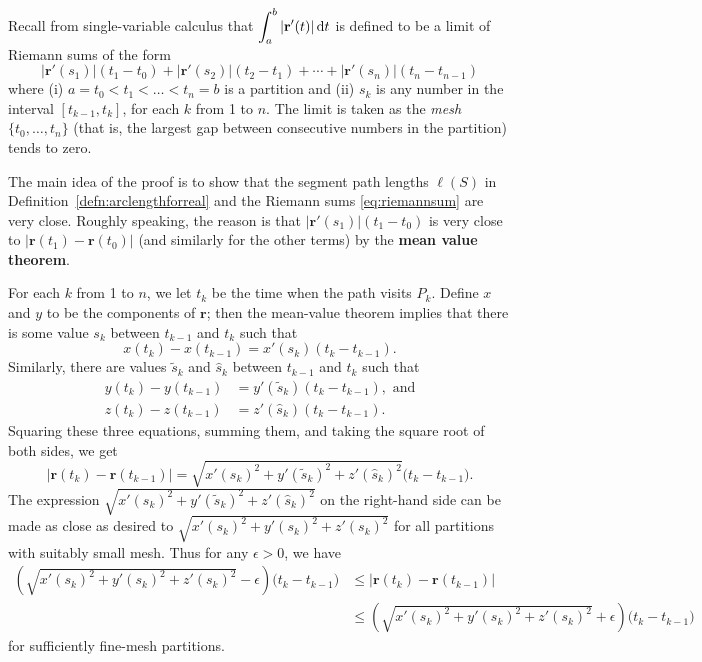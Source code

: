 \documentclass{watsonbook}
\begin{document}
\begin{pf}[title=Proof (idea)]
  Recall from single-variable calculus that
  $\displaystyle{\int_a^b |\mathbf{r}'(t)| \, \mathrm{d}t}$ is defined to be a limit of
  Riemann sums of the form
  \begin{equation} \label{eq:riemannsum}
    |\mathbf{r}'(s_1)|(t_1-t_0) + |\mathbf{r}'(s_2)|(t_2-t_1) + \cdots + |\mathbf{r}'(s_n)|(t_n-t_{n-1})
  \end{equation}
  where (i) $a = t_0 < t_1 < \ldots < t_n = b$ is a partition and
  (ii) $s_k$ is any number in the interval $[t_{k-1},t_k]$, for each
  $k$ from 1 to $n$. The limit is taken as the \textit{mesh}
  $\{t_0, \ldots, t_n\}$ (that is, the largest gap between
  consecutive numbers in the partition) tends to zero. 

  The main idea of the proof is to show that the segment path
  lengths $\ell(S)$ in Definition~\ref{defn:arclengthforreal} and
  the Riemann sums \eqref{eq:riemannsum} are very close. Roughly
  speaking, the reason is that $|\mathbf{r}'(s_1)|(t_1-t_0)$ is very
  close to $|\mathbf{r}(t_1) - \mathbf{r}(t_0)|$ (and similarly for
  the other terms) by the \textbf{mean value theorem}.

  For each $k$ from 1 to $n$, we let $t_k$ be the time when the path
  visits $P_k$. Define $x$ and $y$ to be the components of
  $\mathbf{r}$; then the mean-value theorem implies that there is
  some value $s_k$ between $t_{k-1}$ and $t_k$ such that 
  \[
    x(t_k) - x(t_{k-1}) = x'(s_k)(t_{k}-t_{k-1}). 
  \]
  Similarly, there are values $\tilde{s}_k$ and $\hat{s}_k$ between
  $t_{k-1}$ and $t_k$ such that
  \begin{align*}
    y(t_k) - y(t_{k-1}) &= y'(\tilde{s}_k)(t_{k}-t_{k-1}), \text{ and}\\
    z(t_k) - z(t_{k-1}) &= z'(\hat{s}_k)(t_{k}-t_{k-1}). 
  \end{align*}
  Squaring these three equations, summing them, and taking the
  square root of both sides, we get
  \[
    |\mathbf{r}(t_k) - \mathbf{r}(t_{k-1})| = \sqrt{x'(s_k)^2 +
      y'(\tilde{s}_k)^2 + z'(\hat{s}_k)^2}\bigg(t_k-t_{k-1}\bigg). 
  \]
  The expression
  $\sqrt{x'(s_k)^2 + y'(\tilde{s}_k)^2 + z'(\hat{s}_k)^2}$ on the
  right-hand side can be made as close as desired to
  $\sqrt{x'(s_k)^2 + y'({s}_k)^2 + z'({s}_k)^2}$ for all partitions
  with suitably small mesh. Thus for any $\epsilon > 0$, we have
  \begin{align} \label{eq:ineq}
    \left(\sqrt{x'(s_k)^2 +
    y'({s}_k)^2 + z'({s}_k)^2} - \epsilon\right)
    \bigg(t_k-t_{k-1}\bigg)  
    &\leq
      |\mathbf{r}(t_k) - \mathbf{r}(t_{k-1})| \\ \nonumber
    &\leq \left(\sqrt{x'(s_k)^2 +
      y'({s}_k)^2 + z'({s}_k)^2} + \epsilon\right) \bigg(t_k-t_{k-1}\bigg)
  \end{align}
  for sufficiently fine-mesh partitions. 
  

\end{pf}
\end{document}
